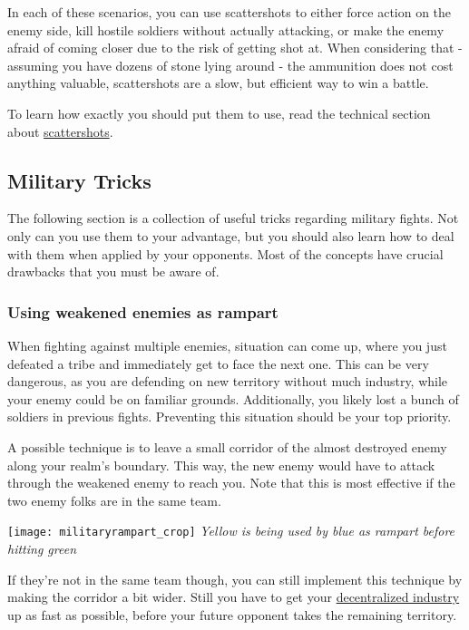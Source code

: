 \documentclass[12pt]{article}
\begin{document}
In each of these scenarios, you can use scattershots to either force action on the enemy side, kill hostile soldiers without actually attacking, or make the enemy afraid of coming closer due to the risk of getting shot at. When considering that - assuming you have dozens of stone lying around - the ammunition does not cost anything valuable, scattershots are a slow, but efficient way to win a battle.

To learn how exactly you should put them to use, read the technical section about \hyperref[sec:scattershot]{scattershots}.

\subsection{Military Tricks}
\label{sec:militarytricks}

The following section is a collection of useful tricks regarding military fights. Not only can you use them to your advantage, but you should also learn how to deal with them when applied by your opponents. Most of the concepts have crucial drawbacks that you must be aware of.

\subsubsection{Using weakened enemies as rampart}
\label{sec:militaryrampart}

When fighting against multiple enemies, situation can come up, where you just defeated a tribe and immediately get to face the next one. This can be very dangerous, as you are defending on new territory without much industry, while your enemy could be on familiar grounds. Additionally, you likely lost a bunch of soldiers in previous fights. Preventing this situation should be your top priority.

A possible technique is to leave a small corridor of the almost destroyed enemy along your realm's boundary. This way, the new enemy would have to attack through the weakened enemy to reach you. Note that this is most effective if the two enemy folks are in the same team.

\vspace{0.6cm}
\texttt{[image: militaryrampart\_crop]}
\textit{Yellow is being used by blue as rampart before hitting green}
\vspace{1cm}

If they're not in the same team though, you can still implement this technique by making the corridor a bit wider. Still you have to get your \hyperref[sec:decentralization]{decentralized industry} up as fast as possible, before your future opponent takes the remaining territory.
\end{document}
